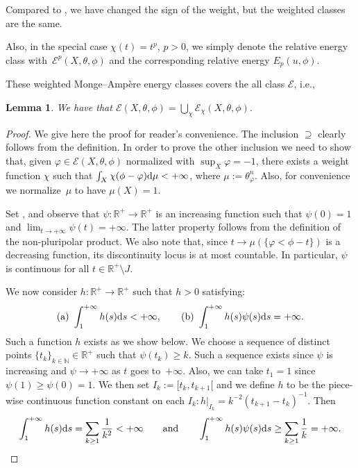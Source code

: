 \documentclass[11pt]{article}
\numberwithin{equation}{section}
\numberwithin{equation}{section}
\newtheorem{Lemma}[Theorem]{Lemma}
\theoremstyle{plain}
\newcommand{\R}{\mathbb R}
\newcommand{\N}{\mathbb N}
\begin{document}
Compared to \cite{GZ07}, we have changed the sign of the weight, but the weighted classes are the same.

Also, in the special case $\chi(t)=t^p$, $p>0$, we simply denote the relative energy class with~${\mathcal{E}^p(X,\theta,\phi)}$
and the corresponding relative energy $E_p(u,\phi)$.

These weighted Monge--Amp\`ere energy classes covers the all class $\mathcal{E}$, i.e.,

\begin{Lemma}\label{energy union} We have that
$\mathcal{E}(X,\theta,\phi)=\bigcup_{\chi}\mathcal{E}_\chi(X,\theta,\phi)$.
\end{Lemma}

\begin{proof}We give here the proof for reader's convenience.
The inclusion $ \supseteq $ clearly follows from the definition. In order to prove the other inclusion we need to show that, given $\varphi \in \mathcal{E}(X,\theta,\phi)$ normalized with $\sup_X \varphi =-1$, there exists a weight function $\chi$ such that $\int_X \chi (\phi-\varphi) {\rm d}\mu < +\infty$, where $\mu:=\theta_\varphi^n$. Also, for convenience we normalize~$\mu$ to have $\mu(X)=1$.

Set , and observe that $\psi\colon\R^+\rightarrow \R^+$ is an increasing function such that $\psi(0)=1$ and $\lim_{t\rightarrow +\infty} \psi(t) =+\infty$. The latter property follows from the definition of the non-pluripolar product. We also note that, since $t\rightarrow \mu(\{\varphi <\phi -t\})$ is a decreasing function, its discontinuity locus is at most countable. In particular, $\psi$ is continuous for all $t\in \R^+\setminus J$.

We now consider $h\colon \R^+\rightarrow \R^+$ such that $h> 0$ satisfying:
\[{\rm (a)} \ \int_1^{+\infty} h(s) {\rm d}s <+\infty, \qquad {\rm (b)} \ \int_1^{+\infty} {h(s)} \psi(s) {\rm d}s =+\infty.\]
 Such a function $h$ exists as we show below. We choose a sequence of distinct points $\{t_k\}_{k\in \N}\in \R^+$ such that $\psi(t_k) \geq k$. Such a sequence exists since $\psi$ is increasing and $\psi\rightarrow +\infty $ as $t$ goes to~$+\infty$. Also, we can take $t_1=1$ since $\psi(1)\geq \psi(0)=1$. We then set $I_k:=[t_{k}, t_{k+1}[$ and we define $h$ to be the piece-wise continuous function constant on each $I_k\colon h|_{I_k}= k^{-2} (t_{k+1}-t_k)^{-1} $. Then
 \[\int_1^{+\infty} h(s) {\rm d}s= \sum_{k\geq 1} \frac{1}{k^2} <+\infty \qquad \text{and}\qquad \int_1^{+\infty}h(s)\psi(s) {\rm d}s\geq \sum_{k\geq 1}\frac{1}{k} =+\infty.\]


\end{proof}
\end{document}
